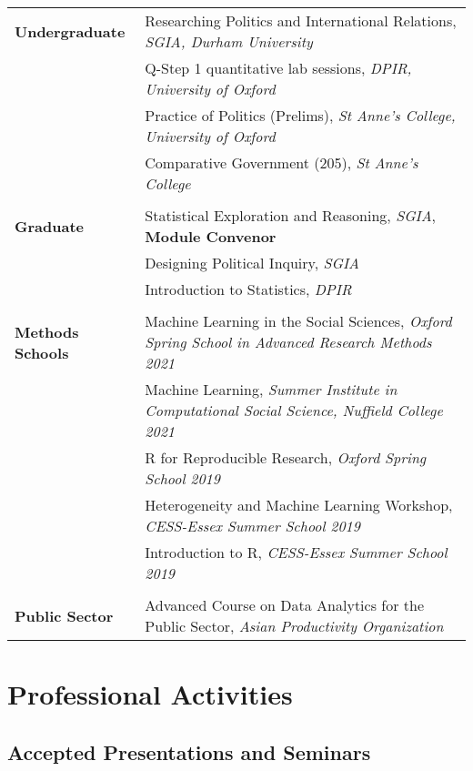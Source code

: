 \documentclass[11pt, a4paper]{article}
\begin{document}
  \begin{tabular}{p{}|p{}}
     \textbf{Undergraduate} 
      & Researching Politics and International Relations, \textit{SGIA, Durham University}\\
      & Q-Step 1 quantitative lab sessions, \textit{DPIR, University of Oxford} \\
      & Practice of Politics (Prelims), \textit{St Anne's College, University of Oxford}\\
      & Comparative Government (205), \textit{St Anne's College} \\
      & \\
      \textbf{Graduate} 
      & Statistical Exploration and Reasoning, \textit{SGIA}, \textbf{Module Convenor} \\
      & Designing Political Inquiry, \textit{SGIA} \\
      &  Introduction to Statistics, \textit{DPIR} \\
      & \\
      \textbf{Methods Schools} & Machine Learning in the Social Sciences, \textit{Oxford Spring School in Advanced Research Methods 2021} \\
      & Machine Learning, \textit{Summer Institute in Computational Social Science, Nuffield College 2021} \\
      & R for Reproducible Research, \textit{Oxford Spring School 2019} \\
      & Heterogeneity and Machine Learning Workshop, \textit{CESS-Essex Summer School 2019} \\
      & Introduction to R, \textit{CESS-Essex Summer School 2019} \\
      & \\
      \textbf{Public Sector} 
      & Advanced Course on Data Analytics for the Public Sector, \textit{Asian Productivity Organization} \\
 \end{tabular}

 \section*{Professional Activities}

 \subsection*{Accepted Presentations and Seminars}
\end{document}
